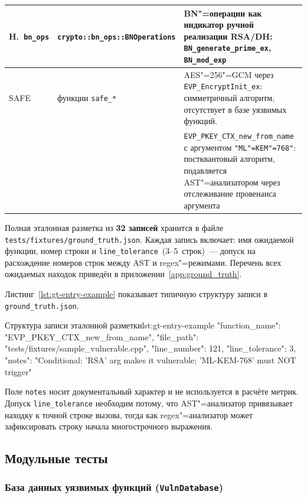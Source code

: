 \begin{longtable}{|p{2.0cm}|p{4.8cm}|p{8.2cm}|}
  H.~\texttt{bn\_ops}
    & \texttt{crypto::\allowbreak bn\_ops::\allowbreak BNOperations}
    & BN"=операции как индикатор ручной реализации RSA/DH:
      \texttt{BN\_generate\_prime\_ex}, \texttt{BN\_mod\_exp} \\ \hline

  SAFE
    & функции \texttt{safe\_*}
    & AES"=256"=GCM через \texttt{EVP\_EncryptInit\_ex}:
      симметричный алгоритм, отсутствует в базе уязвимых функций. \\
    & & \texttt{EVP\_PKEY\_CTX\_new\_from\_name} с аргументом
      \texttt{"ML"=KEM"=768"}: постквантовый алгоритм,
      подавляется AST"=анализатором через отслеживание провенанса
      аргумента \\

\end{longtable}

Полная эталонная разметка из \textbf{32 записей} хранится в файле
\texttt{tests/\allowbreak fixtures/\allowbreak ground\_truth.json}.
Каждая запись включает: имя ожидаемой функции, номер строки и
\texttt{line\_tolerance}~(3--5~строк)~--- допуск на расхождение
номеров строк между AST и regex"=режимами.
Перечень всех ожидаемых находок приведён в
приложении~\ref{app:ground_truth}.

Листинг~\ref{lst:gt-entry-example} показывает типичную структуру
записи в \texttt{ground\_truth.json}.

\begin{itmolisting}[JSON]{Структура записи эталонной разметки}{lst:gt-entry-example}
{
  "function_name": "EVP_PKEY_CTX_new_from_name",
  "file_path": "tests/fixtures/sample_vulnerable.cpp",
  "line_number": 121,
  "line_tolerance": 3,
  "notes": "Conditional: 'RSA' arg makes it vulnerable; 'ML-KEM-768' must NOT trigger"
}
\end{itmolisting}

Поле \texttt{notes} носит документальный характер и не используется
в расчёте метрик.
Допуск \texttt{line\_tolerance} необходим потому, что AST"=анализатор
привязывает находку к точной строке вызова, тогда как regex"=анализатор
может зафиксировать строку начала многострочного выражения.


\subsection{Модульные тесты}

\subsubsection{База данных уязвимых функций (\texttt{VulnDatabase})}

